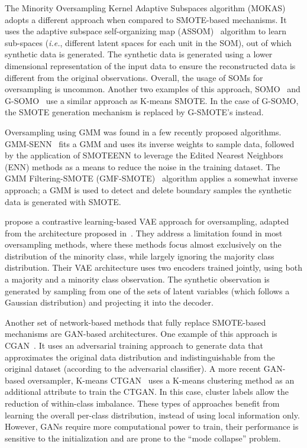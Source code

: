 The Minority Oversampling Kernel Adaptive Subspaces algorithm
(MOKAS)~\cite{lin2017minority} adopts a different approach when compared to
SMOTE-based mechanisms. It uses the adaptive subspace self-organizing map
(ASSOM)~\cite{kohonen1996emergence} algorithm to learn sub-spaces
(\textit{i.e.}, different latent spaces for each unit in the SOM), out of
which synthetic data is generated. The synthetic data is generated using a
lower dimensional representation of the input data to ensure the reconstructed
data is different from the original observations. Overall, the usage of SOMs
for oversampling is uncommon. Another two examples of this approach,
SOMO~\cite{douzas2017self} and G-SOMO~\cite{douzas2021g} use a similar
approach as K-means SMOTE\@. In the case of G-SOMO, the SMOTE
generation mechanism is replaced by G-SMOTE's instead.

Oversampling using GMM was found in a few recently proposed algorithms.
GMM-SENN~\cite{xing2022predict} fits a GMM and uses its inverse weights to
sample data, followed by the application of SMOTEENN to leverage the Edited
Nearest Neighbors (ENN) methods as a means to reduce the noise in the training
dataset. The GMM Filtering-SMOTE (GMF-SMOTE)~\cite{xu2022synthetic} algorithm
applies a somewhat inverse approach; a GMM is used to detect and delete
boundary samples the synthetic data is generated with SMOTE.

\citet{dai2019generative} propose a contrastive learning-based VAE approach
for oversampling, adapted from the architecture proposed
in~\cite{abid2019contrastive}. They address a limitation found in most
oversampling methods, where these methods focus almost exclusively on the
distribution of the minority class, while largely ignoring the majority class
distribution. Their VAE architecture uses two encoders trained jointly, using
both a majority and a minority class observation. The synthetic observation is
generated by sampling from one of the sets of latent variables (which follows
a Gaussian distribution) and projecting it into the decoder.

Another set of network-based methods that fully replace SMOTE-based mechanisms
are GAN-based architectures. One example of this approach is
CGAN~\cite{douzas2018effective}. It uses an adversarial training approach to
generate data that approximates the original data distribution and
indistinguishable from the original dataset (according to the adversarial
classifier). A more recent GAN-based oversampler, K-means CTGAN~\cite{an2021k}
uses a K-means clustering method as an additional attribute to train the
CTGAN\@. In this case, cluster labels allow the reduction of within-class
imbalance. These types of approaches benefit from learning the overall
per-class distribution, instead of using local information only. However, GANs
require more computational power to train, their performance is sensitive to
the initialization and are prone to the ``mode collapse'' problem.

